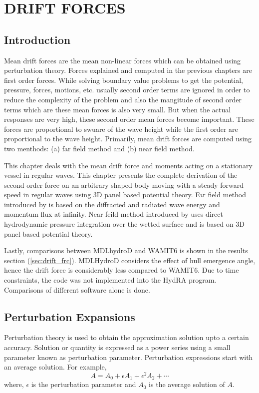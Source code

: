 \chapter{DRIFT FORCES}
\section{Introduction}
Mean drift forces are the mean non-linear forces which can be obtained using perturbation theory. 
Forces explained and computed in the previous chapters
are first order forces. While solving boundary value problems to get the potential, pressure, forces, 
motions, etc. usually
second order terms are ignored in order to reduce the complexity of the problem and also the mangitude of
second order terms which are these mean forces is also very small. But when the actual responses are very high,
these second order mean forces become important. These forces are proportional to swuare of the wave height 
while the 
first order are proportional to the wave height. Primarily, mean drift forces are computed using two menthods:
(a) far field method and (b) near field method.

This chapter deals with the mean drift force and moments acting on a stationary vessel in regular waves. This chapter
presents the complete derivation of the second order force on an arbitrary shaped body moving with a steady 
forward speed in regular waves using 3D panel based potential theory. Far field method introduced by
\cite{maruo1957excess} is based on the diffracted and radiated wave energy and momentum flux at infinity. Near feild
method introduced by \cite{boese1970einfache} uses direct hydrodynamic pressure integration over the wetted surface and 
is based on 3D panel based potential theory.

Lastly, comparisons between MDLhydroD and WAMIT6 is shown in the results section (\ref{sec:drift_frc}).
MDLHydroD considers the effect of hull emergence angle, hence the drift force is considerably
less compared to WAMIT6. Due to time constraints, the code was not implemented into the HydRA
program. Comparisons of different software alone is done.

\section{Perturbation Expansions}
\label{sec:perturbation_exp}
Perturbation theory is used to obtain the approximation solution upto a certain accuracy. Solution or quantity is 
expressed as a power series using a small parameter known as perturbation parameter. Perturbation expressions
start with an average solution.
For example, 
\begin{equation}
    A = A_0 + \epsilon A_1 + \epsilon^2 A_2 + \cdots
\end{equation}
where, $\epsilon$ is the perturbation parameter and $A_0$ is the average solution of $A$.

